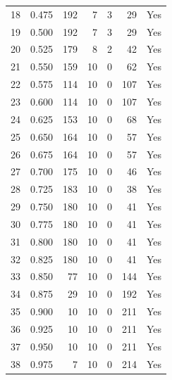 \documentclass[a4paper,twoside,12pt]{book}
\begin{document}
\begin{appendices}
\begin{table}
\begin{tabular}{lrrrrrl}
		18 &  0.475 &       192 &         7 &               3 &              29 &    Yes \\
		19 &  0.500 &       192 &         7 &               3 &              29 &    Yes \\
		20 &  0.525 &       179 &         8 &               2 &              42 &    Yes \\
		21 &  0.550 &       159 &        10 &               0 &              62 &    Yes \\
		22 &  0.575 &       114 &        10 &               0 &             107 &    Yes \\
		23 &  0.600 &       114 &        10 &               0 &             107 &    Yes \\
		24 &  0.625 &       153 &        10 &               0 &              68 &    Yes \\
		25 &  0.650 &       164 &        10 &               0 &              57 &    Yes \\
		26 &  0.675 &       164 &        10 &               0 &              57 &    Yes \\
		27 &  0.700 &       175 &        10 &               0 &              46 &    Yes \\
		28 &  0.725 &       183 &        10 &               0 &              38 &    Yes \\
		29 &  0.750 &       180 &        10 &               0 &              41 &    Yes \\
		30 &  0.775 &       180 &        10 &               0 &              41 &    Yes \\
		31 &  0.800 &       180 &        10 &               0 &              41 &    Yes \\
		32 &  0.825 &       180 &        10 &               0 &              41 &    Yes \\
		33 &  0.850 &        77 &        10 &               0 &             144 &    Yes \\
		34 &  0.875 &        29 &        10 &               0 &             192 &    Yes \\
		35 &  0.900 &        10 &        10 &               0 &             211 &    Yes \\
		36 &  0.925 &        10 &        10 &               0 &             211 &    Yes \\
		37 &  0.950 &        10 &        10 &               0 &             211 &    Yes \\
		38 &  0.975 &         7 &        10 &               0 &             214 &    Yes \\

\end{tabular}
\end{table}
\end{appendices}
\end{document}
